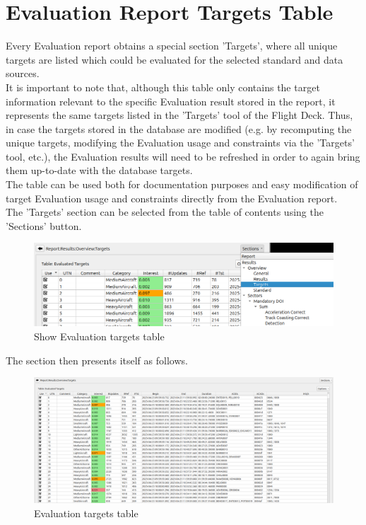 \section{Evaluation Report Targets Table}
\label{sec:eval_report_targets}

Every Evaluation report obtains a special section 'Targets', where all unique targets 
are listed which could be evaluated for the selected standard and data sources. \\

It is important to note that, although this table only contains the target information relevant to the specific Evaluation result stored in the report,
it represents the same targets listed in the 'Targets' tool of the Flight Deck. 
Thus, in case the targets stored in the database are modified (e.g. by recomputing the unique targets, modifying the Evaluation usage and constraints via the 'Targets' tool, etc.), 
the Evaluation results will need to be refreshed in order to again bring them up-to-date with the database targets. \\

The table can be used both for documentation purposes and easy modification of target Evaluation usage and 
constraints directly from the Evaluation report. \\

The 'Targets' section can be selected from the table of contents using the 'Sections' button.

\begin{figure}[H]
  \hspace*{-2cm}
  \center
    \includegraphics[width=15cm,frame]{figures/eval_targets_section.png}
  \caption{Show Evaluation targets table}
\end{figure}

The section then presents itself as follows.

\begin{figure}[H]
  \hspace*{-2cm}
  \center
    \includegraphics[width=17cm,frame]{figures/eval_targets_table.png}
  \caption{Evaluation targets table}
\end{figure}

